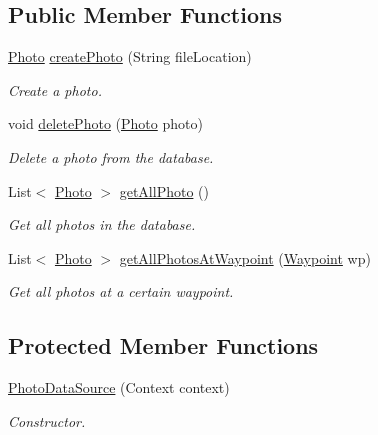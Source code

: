 \subsection*{Public Member Functions}
\begin{DoxyCompactItemize}
\item 
\hyperlink{classuk_1_1ac_1_1swan_1_1digitaltrails_1_1components_1_1_photo}{Photo} \hyperlink{classuk_1_1ac_1_1swan_1_1digitaltrails_1_1database_1_1_photo_data_source_aefd684db05aee6268c1f3152a8aa7890}{create\+Photo} (String file\+Location)
\begin{DoxyCompactList}\small\item\em Create a photo. \end{DoxyCompactList}\item 
void \hyperlink{classuk_1_1ac_1_1swan_1_1digitaltrails_1_1database_1_1_photo_data_source_a1a3612d004d35625a839e616f307d16c}{delete\+Photo} (\hyperlink{classuk_1_1ac_1_1swan_1_1digitaltrails_1_1components_1_1_photo}{Photo} photo)
\begin{DoxyCompactList}\small\item\em Delete a photo from the database. \end{DoxyCompactList}\item 
List$<$ \hyperlink{classuk_1_1ac_1_1swan_1_1digitaltrails_1_1components_1_1_photo}{Photo} $>$ \hyperlink{classuk_1_1ac_1_1swan_1_1digitaltrails_1_1database_1_1_photo_data_source_a5212670aca30b72a4dc70d4b0f0d2b30}{get\+All\+Photo} ()
\begin{DoxyCompactList}\small\item\em Get all photos in the database. \end{DoxyCompactList}\item 
List$<$ \hyperlink{classuk_1_1ac_1_1swan_1_1digitaltrails_1_1components_1_1_photo}{Photo} $>$ \hyperlink{classuk_1_1ac_1_1swan_1_1digitaltrails_1_1database_1_1_photo_data_source_ac4656becf989cd3547fd912d8151d77b}{get\+All\+Photos\+At\+Waypoint} (\hyperlink{classuk_1_1ac_1_1swan_1_1digitaltrails_1_1components_1_1_waypoint}{Waypoint} wp)
\begin{DoxyCompactList}\small\item\em Get all photos at a certain waypoint. \end{DoxyCompactList}\end{DoxyCompactItemize}
\subsection*{Protected Member Functions}
\begin{DoxyCompactItemize}
\item 
\hyperlink{classuk_1_1ac_1_1swan_1_1digitaltrails_1_1database_1_1_photo_data_source_a411851791cc208c708ca6208ae41e8a5}{Photo\+Data\+Source} (Context context)
\begin{DoxyCompactList}\small\item\em Constructor. \end{DoxyCompactList}\end{DoxyCompactItemize}
